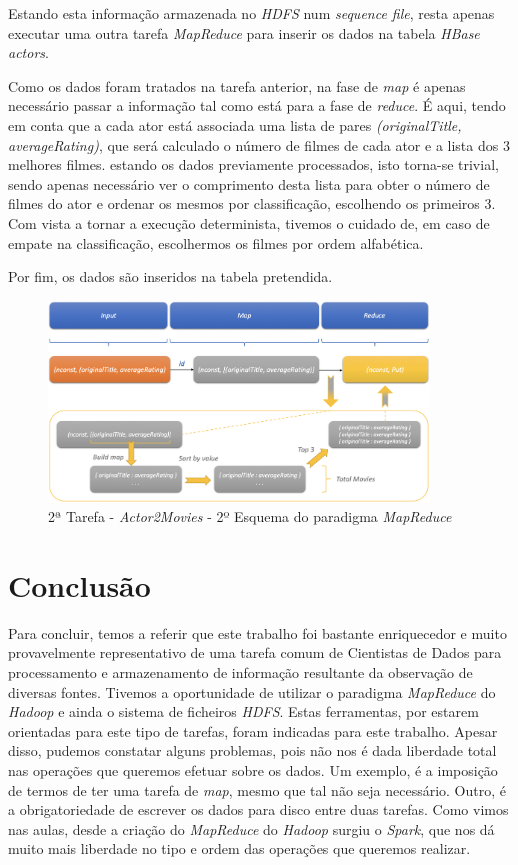 \documentclass[a4paper]{report}
\begin{document}
{			Estando esta informação armazenada no \textit{HDFS} num \textit{sequence file}, resta apenas executar uma outra tarefa \textit{MapReduce} para inserir os dados na tabela \textit{HBase actors}.
			
			Como os dados foram tratados na tarefa anterior, na fase de \textit{map} é apenas necessário passar a informação tal como está para a fase de \textit{reduce}. É aqui, tendo em conta que a cada ator está associada uma lista de pares \textit{(originalTitle, averageRating)}, que será calculado o número de filmes de cada ator e a lista dos 3 melhores filmes. estando os dados previamente processados, isto torna-se trivial, sendo apenas necessário ver o comprimento desta lista para obter o número de filmes do ator e ordenar os mesmos por classificação, escolhendo os primeiros 3. Com vista a tornar a execução determinista, tivemos o cuidado de, em caso de empate na classificação, escolhermos os filmes por ordem alfabética.
			
			Por fim, os dados são inseridos na tabela pretendida.
			\begin{figure}[H]
				\centering
				\includegraphics[width=0.9\textwidth]{Imagens/2ª Tarefa - Actor2Movies - 2º Esquema MapReduce.png}
				\caption{2ª Tarefa - \textit{Actor2Movies} - 2º Esquema do paradigma \textit{MapReduce}}
				\label{fig:20}
			\end{figure}
}

\chapter{Conclusão} \label{ch:Conclusion}
\large{
	Para concluir, temos a referir que este trabalho foi bastante enriquecedor e muito provavelmente representativo de uma tarefa comum de Cientistas de Dados para processamento e armazenamento de informação resultante da observação de diversas fontes.
	Tivemos a oportunidade de utilizar o paradigma \textit{MapReduce} do \textit{Hadoop} e ainda o sistema de ficheiros \textit{HDFS}. Estas ferramentas, por estarem orientadas para este tipo de tarefas, foram indicadas para este trabalho. Apesar disso, pudemos constatar alguns problemas, pois não nos é dada liberdade total nas operações que queremos efetuar sobre os dados. Um exemplo, é a imposição de termos de ter uma tarefa de \textit{map}, mesmo que tal não seja necessário. Outro, é a obrigatoriedade de escrever os dados para disco entre duas tarefas.
	Como vimos nas aulas, desde a criação do \textit{MapReduce} do \textit{Hadoop} surgiu o \textit{Spark}, que nos dá muito mais liberdade no tipo e ordem das operações que queremos realizar.
}
\end{document}
